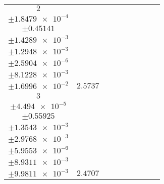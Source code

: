 \documentclass[8pt]{article}
\begin{document}
\begin{longtable}[l]{c c c c c c c c c}
$\num{2}$ & \begin{tabular}[c]{@{}c@{}}$\num{3.0172e-2}$ \\ $\pm\num{1.8479e-4}$\end{tabular} & \begin{tabular}[c]{@{}c@{}}$\num{-0.26856}$ \\ $\pm\num{0.45141}$\end{tabular} & \begin{tabular}[c]{@{}c@{}}$\num{-7.2843}$ \\ $\pm\num{1.4289e-3}$\end{tabular} & \begin{tabular}[c]{@{}c@{}}$\num{1.1724e+3}$ \\ $\pm\num{1.2948e-3}$\end{tabular} & \begin{tabular}[c]{@{}c@{}}$\num{2.3454}$ \\ $\pm\num{2.5904e-6}$\end{tabular} & \begin{tabular}[c]{@{}c@{}}$\num{1.1496}$ \\ $\pm\num{8.1228e-3}$\end{tabular} & \begin{tabular}[c]{@{}c@{}}$\num{4.0986}$ \\ $\pm\num{1.6996e-2}$\end{tabular} & $\num{2.5737}$\\
$\num{3}$ & \begin{tabular}[c]{@{}c@{}}$\num{2.9612e-2}$ \\ $\pm\num{4.494e-5}$\end{tabular} & \begin{tabular}[c]{@{}c@{}}$\num{-0.34709}$ \\ $\pm\num{0.55925}$\end{tabular} & \begin{tabular}[c]{@{}c@{}}$\num{-7.0649}$ \\ $\pm\num{1.3543e-3}$\end{tabular} & \begin{tabular}[c]{@{}c@{}}$\num{1.1726e+3}$ \\ $\pm\num{2.9768e-3}$\end{tabular} & \begin{tabular}[c]{@{}c@{}}$\num{2.3459}$ \\ $\pm\num{5.9553e-6}$\end{tabular} & \begin{tabular}[c]{@{}c@{}}$\num{1.1425}$ \\ $\pm\num{8.9311e-3}$\end{tabular} & \begin{tabular}[c]{@{}c@{}}$\num{4.0974}$ \\ $\pm\num{9.9811e-3}$\end{tabular} & $\num{2.4707}$\\

\end{longtable}
\end{document}
